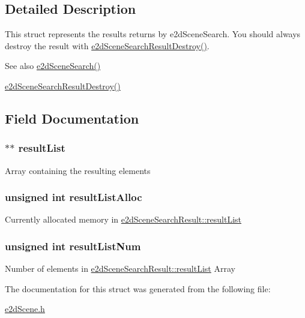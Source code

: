 \subsection{Detailed Description}
This struct represents the results returns by e2d\-Scene\-Search. You should always destroy the result with \hyperlink{group__e2dScene_ga0eedd7c50a3d65e91abd54fcee3de39d}{e2d\-Scene\-Search\-Result\-Destroy()}. 

\begin{DoxySeeAlso}{See also}
\hyperlink{group__e2dScene_ga222c136346e92572235795d05c259e72}{e2d\-Scene\-Search()} 

\hyperlink{group__e2dScene_ga0eedd7c50a3d65e91abd54fcee3de39d}{e2d\-Scene\-Search\-Result\-Destroy()} 
\end{DoxySeeAlso}


\subsection{Field Documentation}
\hypertarget{structe2dSceneSearchResult_acb54f0ae39cc6710460aa41f5f0afd9f}{
\subsubsection[{result\-List}]{$\ast$$\ast$ {\bf result\-List}}}\label{structe2dSceneSearchResult_acb54f0ae39cc6710460aa41f5f0afd9f}
Array containing the resulting elements \hypertarget{structe2dSceneSearchResult_a0b7370bba258bd87e0d7ae10af711d34}{
\subsubsection[{result\-List\-Alloc}]{\setlength{\rightskip}{0pt plus 5cm}unsigned int {\bf result\-List\-Alloc}}}\label{structe2dSceneSearchResult_a0b7370bba258bd87e0d7ae10af711d34}
Currently allocated memory in \hyperlink{structe2dSceneSearchResult_acb54f0ae39cc6710460aa41f5f0afd9f}{e2d\-Scene\-Search\-Result\-::result\-List} \hypertarget{structe2dSceneSearchResult_a65874957dc9197a16158b3807acb5d1e}{
\subsubsection[{result\-List\-Num}]{\setlength{\rightskip}{0pt plus 5cm}unsigned int {\bf result\-List\-Num}}}\label{structe2dSceneSearchResult_a65874957dc9197a16158b3807acb5d1e}
Number of elements in \hyperlink{structe2dSceneSearchResult_acb54f0ae39cc6710460aa41f5f0afd9f}{e2d\-Scene\-Search\-Result\-::result\-List} Array 

The documentation for this struct was generated from the following file\-:\begin{DoxyCompactItemize}
\item 
\hyperlink{e2dScene_8h}{e2d\-Scene.\-h}\end{DoxyCompactItemize}
